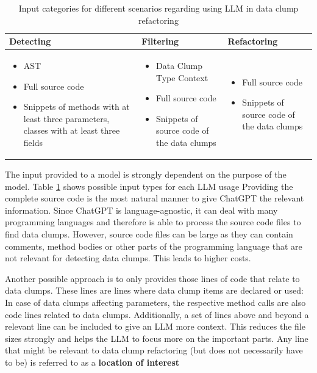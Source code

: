 \begin{table}[]
    \centering
    \begin{tabular} {m{4cm} | m{4cm} | m{4cm}}
        Detecting & Filtering & Refactoring  \\\hline
         \begin{itemize}
             \item AST
             \item Full source code 
             \item Snippets of methods with at least three parameters, classes with at least three fields
         \end{itemize} & \begin{itemize}
             \item Data Clump Type Context
             \item Full source code
             \item Snippets of source code of the data clumps
         \end{itemize} & \begin{itemize}
             \item Full source code 
             \item Snippets of source code of the data clumps
         \end{itemize}
    \end{tabular}
    \caption{Input categories for different scenarios regarding using \ac{LLM} in data clump refactoring}
    \label{tab:data_clump_llm_input}
\end{table}

The input provided to a model is strongly dependent on the purpose of the model. Table \ref{tab:data_clump_llm_input} shows possible input types for each \ac{LLM} usage
Providing the complete source code is the most natural manner to give ChatGPT the relevant information. Since ChatGPT is language-agnostic, it can deal with many programming languages and therefore is able to process the source code files to find data clumps. However, source code files can be large as they can contain comments, method bodies or other parts of the programming language that are not relevant for detecting data clumps. This leads to higher costs.

Another possible approach is to only provides those lines of code that relate to data clumps. These lines are lines where data clump items are declared or used: In case of data clumps affecting parameters, the respective method calls are also code lines related to data clumps. Additionally, a set of lines above and beyond a relevant line can be included to give an \ac{LLM} more context. This reduces the file sizes strongly and helps the \ac{LLM} to focus more on the important parts. Any line that might be relevant to data clump refactoring (but does not necessarily have to be) is referred to as a \textbf{location of interest}

